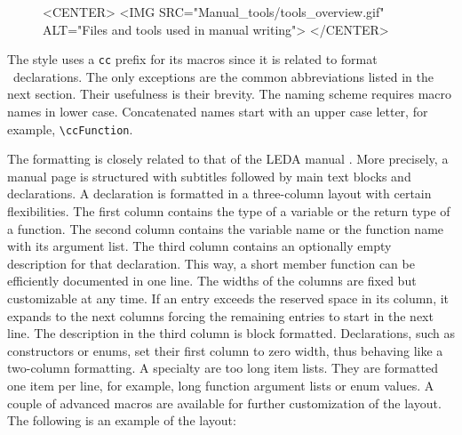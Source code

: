 \documentclass[11pt]{article}
\makeatletter
\newcommand{\TTindex}[1]{\index{#1@{\tt #1}}}
\newcommand{\Dindex}[1]{#1\index{#1}}
\makeatother
\begin{document}
\def\figuretopindent{\vspace{2ex}}

\begin{figure}
    \label{ToolsOverviewFig}\figuretopindent
\begin{ccHtmlOnly}
<CENTER>
  <IMG SRC="Manual_tools/tools_overview.gif" ALT="Files and tools used in manual writing">
</CENTER>
\end{ccHtmlOnly}
\end{figure}

 The style uses a {\tt cc} prefix for its macros since it is related to format \CC\ 
declarations. The only exceptions are the common abbreviations listed
in the next section. Their usefulness is their brevity. The naming
scheme requires macro names in lower case.  Concatenated names start
with an upper case letter, for example, \verb+\ccFunction+.

 The formatting is closely related to that of the
LEDA\TTindex{LEDA} manual \cite{Naeher95}.  More precisely, a manual
page is structured with subtitles followed by main text blocks and
declarations. A declaration is formatted in a \Dindex{three-column
  layout} with certain flexibilities.  The first column contains the
type of a variable or the return type of a function. The second column
contains the variable name or the function name with its argument
list. The third column contains an optionally empty description for
that declaration. This way, a short member function can be efficiently
documented in one line. The widths of the columns are fixed but
customizable at any time. If an entry exceeds the reserved space in
its column, it expands to the next columns forcing the remaining
entries to start in the next line. The description in the third column
is block formatted.  Declarations, such as constructors or enums, set
their first column to zero width, thus behaving like a two-column
formatting.  A specialty are too long \Dindex{item lists}.  They are
formatted one item per line, for example, long function argument lists
or enum values. A couple of advanced macros are available for further
customization of the layout. The following is an example of the
layout: 
\end{document}
